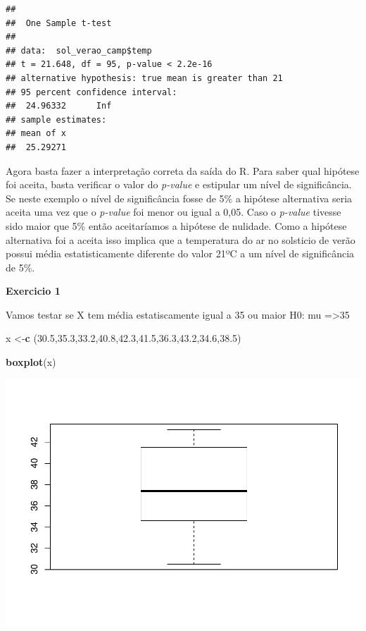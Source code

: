 \documentclass[
]{book}
\newenvironment{Shaded}{\begin{snugshade}}{\end{snugshade}}
\newcommand{\FloatTok}[1]{\textcolor[rgb]{0.00,0.00,0.81}{#1}}
\newcommand{\KeywordTok}[1]{\textcolor[rgb]{0.13,0.29,0.53}{\textbf{#1}}}
\newcommand{\NormalTok}[1]{#1}
\begin{document}
\begin{verbatim}
## 
##  One Sample t-test
## 
## data:  sol_verao_camp$temp
## t = 21.648, df = 95, p-value < 2.2e-16
## alternative hypothesis: true mean is greater than 21
## 95 percent confidence interval:
##  24.96332      Inf
## sample estimates:
## mean of x 
##  25.29271
\end{verbatim}

Agora basta fazer a interpretação correta da saída do R.
Para saber qual hipótese foi aceita, basta verificar o valor do \emph{p-value} e estipular um nível de significância. Se neste exemplo o nível de significância fosse de 5\% a hipótese alternativa seria aceita uma vez que o \emph{p-value} foi menor ou igual a 0,05. Caso o \emph{p-value} tivesse sido maior que 5\% então aceitaríamos a hipótese de nulidade.
Como a hipótese alternativa foi a aceita isso implica que a temperatura do ar no solsticio de verão possui média estatisticamente diferente do valor 21ºC a um nível de significância de 5\%.

\textbf{Exercicio 1}

Vamos testar se X tem média estatiscamente igual a 35 ou maior
H0: mu =\textgreater35

\begin{Shaded}
\begin{Highlighting}[]
\NormalTok{x <-}\KeywordTok{c}\NormalTok{ (}\FloatTok{30.5}\NormalTok{,}\FloatTok{35.3}\NormalTok{,}\FloatTok{33.2}\NormalTok{,}\FloatTok{40.8}\NormalTok{,}\FloatTok{42.3}\NormalTok{,}\FloatTok{41.5}\NormalTok{,}\FloatTok{36.3}\NormalTok{,}\FloatTok{43.2}\NormalTok{,}\FloatTok{34.6}\NormalTok{,}\FloatTok{38.5}\NormalTok{)}

\KeywordTok{boxplot}\NormalTok{(x)}
\end{Highlighting}
\end{Shaded}

\includegraphics{TudodoR_files/figure-latex/unnamed-chunk-250-1.pdf}
\end{document}
